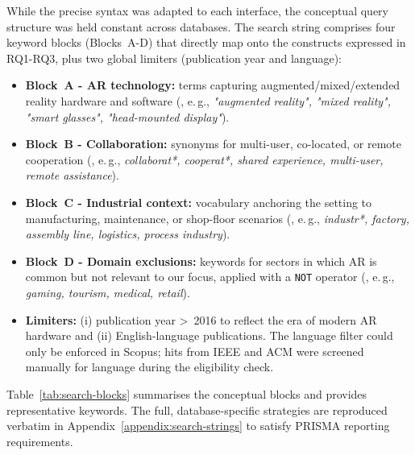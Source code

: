 While the precise syntax was adapted to each interface, the conceptual query structure was held constant across databases. The search string comprises four keyword blocks (Blocks~A-D) that directly map onto the constructs expressed in RQ1-RQ3, plus two global limiters (publication year and language):

\begin{itemize}
    \item \textbf{Block~A - AR technology:} terms capturing augmented/mixed/extended reality hardware and software (, e.\,g., \emph{"augmented reality", "mixed reality", "smart glasses", "head-mounted display"}).
    \item \textbf{Block~B - Collaboration:} synonyms for multi-user, co-located, or remote cooperation (, e.\,g., \emph{collaborat*, cooperat*, shared experience, multi-user, remote assistance}).
    \item \textbf{Block~C - Industrial context:} vocabulary anchoring the setting to manufacturing, maintenance, or shop-floor scenarios (, e.\,g., \emph{industr*, factory, assembly line, logistics, process industry}).
    \item \textbf{Block~D - Domain exclusions:} keywords for sectors in which AR is common but not relevant to our focus, applied with a \texttt{NOT} operator (, e.\,g., \emph{gaming, tourism, medical, retail}).
    \item \textbf{Limiters:} (i) publication year \textgreater{}~2016 to reflect the era of modern AR hardware and (ii) English-language publications. The language filter could only be enforced in Scopus; hits from IEEE and ACM were screened manually for language during the eligibility check.
\end{itemize}

Table~\ref{tab:search-blocks} summarises the conceptual blocks and provides representative keywords. The full, database-specific strategies are reproduced verbatim in Appendix~\ref{appendix:search-strings} to satisfy PRISMA reporting requirements.


